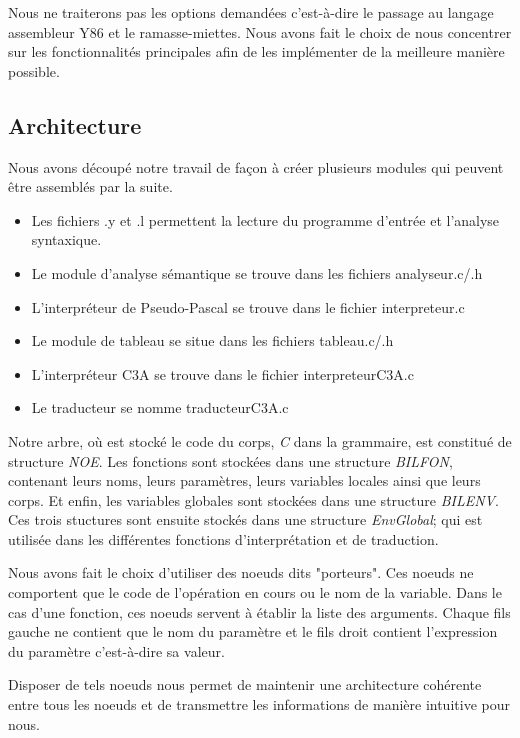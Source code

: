 \documentclass[10pt,a4paper]{article}
\begin{document}
Nous ne traiterons pas les options demandées c'est-à-dire le passage au langage assembleur Y86 et le ramasse-miettes.
Nous avons fait le choix de nous concentrer sur les fonctionnalités principales afin de les implémenter de la meilleure manière possible.

\subsection{Architecture}
Nous avons découpé notre travail de façon à créer plusieurs modules qui peuvent être assemblés par la suite.


\begin{itemize}
    \item Les fichiers .y et .l permettent la lecture du programme d'entrée et l'analyse syntaxique.
    \item Le module d'analyse sémantique se trouve dans les fichiers analyseur.c/.h
    \item L'interpréteur de Pseudo-Pascal se trouve dans le fichier interpreteur.c
    \item Le module de tableau se situe dans les fichiers tableau.c/.h
    \item L'interpréteur C3A se trouve dans le fichier interpreteurC3A.c
    \item Le traducteur se nomme traducteurC3A.c
\end{itemize}

Notre arbre, où est stocké le code du corps, \textit{C} dans la grammaire,  est constitué de structure \textit{NOE}. Les fonctions sont stockées dans une structure \textit{BILFON}, contenant leurs noms, leurs paramètres, leurs variables locales ainsi que leurs corps. Et enfin, les variables globales sont stockées dans une structure \textit{BILENV}. Ces trois stuctures sont ensuite stockés dans une structure \textit{EnvGlobal}; qui est utilisée dans les différentes fonctions d'interprétation et de traduction.

Nous avons fait le choix d'utiliser des noeuds dits "porteurs". Ces noeuds ne comportent que le code de l'opération en cours ou le nom de la variable. Dans le cas d'une fonction, ces noeuds servent à établir la liste des arguments. Chaque fils gauche ne contient que le nom du paramètre et le fils droit contient l'expression du paramètre c'est-à-dire sa valeur.

Disposer de tels noeuds nous permet de maintenir une architecture cohérente entre tous les noeuds et de transmettre les informations de manière intuitive pour nous.
  
\end{document}
